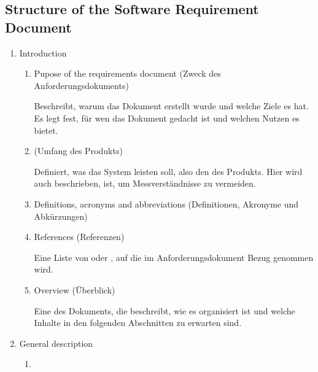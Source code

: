 \subsection*{Structure of the Software Requirement Document}
\begin{defBox}[title=Requirements specification document (shortened from: ISO/IEC/IEEE 29148:2011)]
    \begin{enumerate}
        \item Introduction
        \begin{enumerate}
            \item Pupose of the requirements document (Zweck des Anforderungsdokuments)
            \begin{infoBox}
                Beschreibt, warum das Dokument erstellt wurde und welche Ziele es hat. Es legt fest, für wen das Dokument gedacht ist und welchen Nutzen es bietet.
            \end{infoBox}
            \item {} (Umfang des Produkts)
            \begin{infoBox}
                Definiert, was das System leisten soll, also den  des Produkts. Hier wird auch beschrieben,  ist, um Messverständnisse zu vermeiden.
            \end{infoBox}
            \item Definitions, acronyms and abbreviations (Definitionen, Akronyme und Abkürzungen)
            \item References (Referenzen)
            \begin{infoBox}
                Eine Liste von  oder , auf die im Anforderungsdokument Bezug genommen wird.
            \end{infoBox}
            \item Overview (Überblick)
            \begin{infoBox}
                Eine  des Dokuments, die beschreibt, wie es organisiert ist und welche Inhalte in den folgenden Abschnitten zu erwarten sind.
            \end{infoBox}
        \end{enumerate}
        \item General description
        \begin{enumerate}
            \item {}

\end{enumerate}
\end{enumerate}
\end{defBox}
